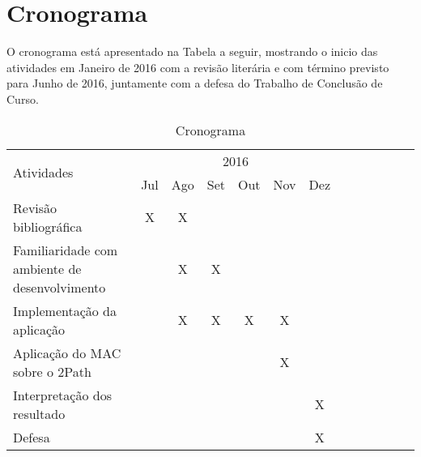 \chapter{Cronograma}

\indent O cronograma está apresentado na Tabela a seguir, mostrando o inicio das atividades em Janeiro de 2016 com 
a revisão literária e com término previsto para Junho de 2016, juntamente com a defesa do Trabalho de Conclusão de Curso. 


\begin{table}[h!]
\centering
\caption{Cronograma}
\begin{tabular}{|l|c|c|c|c|c|c|c|c|c|c|c|c|}
\hline
 \multirow{2}{*}{Atividades} & \multicolumn{6}{|c|}{2016} \\ \cline{2-7}
 & Jul & Ago & Set & Out & Nov & Dez  \\ \hline
Revisão bibliográfica & X & X &  &  &  &    \\ \hline
Familiaridade com ambiente de desenvolvimento &  & X & X &  &  &   \\ \hline
Implementação da aplicação &  & X & X & X & X &   \\ \hline
Aplicação do MAC sobre o 2Path &  &  &  &  & X &   \\ \hline
Interpretação dos resultado &  &  &  &  &  & X  \\ \hline 
Defesa &  &  &  &  &  & X  \\ \hline
 
\end{tabular}
\end{table}

